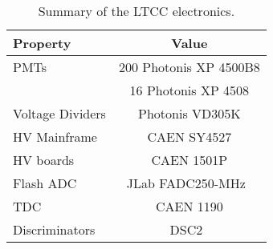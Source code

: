 \begin{table}[h]
	\begin{center}
		\begin{tabular}{| l | c |}
			\hline \hline
			Property                 & Value \\
			\hline
			PMTs             & 200 Photonis XP 4500B8    \\
	                         & 16 Photonis XP 4508       \\
			Voltage Dividers & Photonis VD305K           \\
			HV Mainframe     & CAEN SY4527               \\
			HV boards        & CAEN 1501P                     \\
			Flash ADC        & JLab FADC250-MHz~\cite{daq-nim} \\
			TDC              & CAEN 1190                 \\
			Discriminators   & DSC2~\cite{daq-nim}        \\
			\hline \hline
		\end{tabular}
	\end{center}
	\caption{Summary of the LTCC electronics.}
        \label{tab:ltccChannels}
\end{table}
